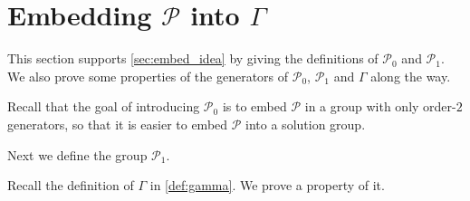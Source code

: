 \documentclass[11pt,letterpaper]{article}
\newcommand{\ket}[1]{|#1\rangle}
\newcommand{\ketbra}[2]{|#1\rangle\langle#2|}
\DeclareMathOperator{\Tr}{Tr}
\DeclareMathOperator{\supp}{supp}
\newcommand{\1}{\mathbb{1}}
\newcommand{\Pg}{\mathcal{P}}
\newcommand{\CHSH}{CHSH^{(d)}}
\newcommand{\tA}{\tilde{A}}
\newcommand{\tU}{\tilde{U}}
\theoremstyle{definition}
\begin{document}




\appendix

\section{Embedding $\Pg$ into $\Gamma$}
\label{sec:embedding}
This section supports \cref{sec:embed_idea} by giving the definitions
of $\Pg_0$ and $\Pg_1$.
We also prove some properties of the generators of $\Pg_0$, $\Pg_1$ and 
$\Gamma$ along the way.

Recall that the goal of introducing $\Pg_0$ is to embed
$\Pg$ in a group with only order-$2$ generators,
so that it is easier to embed $\Pg$ into a solution group.



Next we define the group $\Pg_1$.


Recall the definition of $\Gamma$ in \cref{def:gamma}. We prove a property of it.

\end{document}
